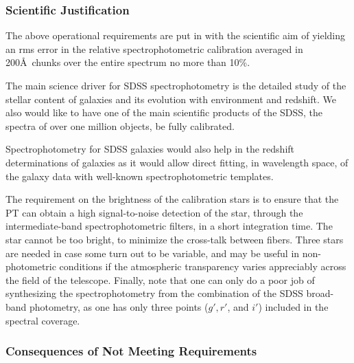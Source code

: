 \subsubsection{Scientific Justification}

The above operational requirements are put in with the scientific aim
of yielding an rms error in the relative spectrophotometric calibration
averaged in 200\AA\ chunks over the entire spectrum no more than
10\%. 

The main science driver for SDSS spectrophotometry is the detailed
study of the stellar content of galaxies and its evolution with
environment and redshift.  We also would like to have one of the main
scientific products of the SDSS, the spectra of over one million
objects, be fully calibrated. 

Spectrophotometry for SDSS galaxies would also help in the redshift
determinations of galaxies as it would allow direct fitting, in
wavelength space, of the galaxy data with well-known
spectrophotometric templates.

The requirement on the brightness of the calibration stars is to
ensure that the PT can obtain a high signal-to-noise detection of
the star, through the intermediate-band spectrophotometric filters,
in a short integration time.  The star cannot be too bright, to
minimize the cross-talk between fibers.  Three stars are needed in
case some turn out to be variable, and may be useful in
non-photometric conditions if the atmospheric transparency varies
appreciably across the field of the telescope.  Finally, note that one
can only do a poor job of synthesizing the spectrophotometry from the
combination of the SDSS broad-band photometry, as one has only three
points ($g', r'$, and $i'$) included in the spectral coverage. 

\subsubsection{Consequences of Not Meeting Requirements}


